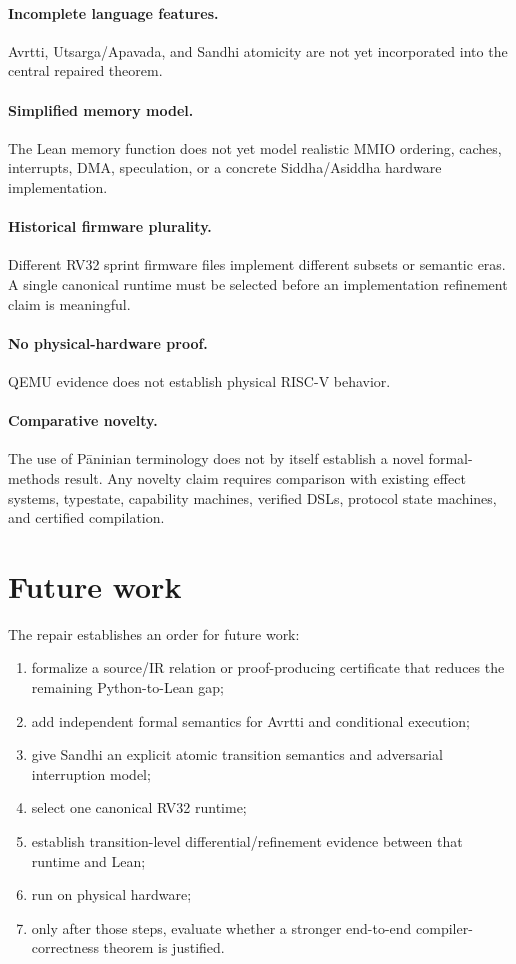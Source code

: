 \documentclass[11pt,a4paper]{article}
\begin{document}
\paragraph{Incomplete language features.}
Avrtti, Utsarga/Apavada, and Sandhi atomicity are not yet incorporated into
the central repaired theorem.

\paragraph{Simplified memory model.}
The Lean memory function does not yet model realistic MMIO ordering, caches,
interrupts, DMA, speculation, or a concrete Siddha/Asiddha hardware
implementation.

\paragraph{Historical firmware plurality.}
Different RV32 sprint firmware files implement different subsets or semantic
eras. A single canonical runtime must be selected before an implementation
refinement claim is meaningful.

\paragraph{No physical-hardware proof.}
QEMU evidence does not establish physical RISC-V behavior.

\paragraph{Comparative novelty.}
The use of P\={a}ninian terminology does not by itself establish a novel
formal-methods result. Any novelty claim requires comparison with existing
effect systems, typestate, capability machines, verified DSLs, protocol state
machines, and certified compilation.

\section{Future work}

The repair establishes an order for future work:

\begin{enumerate}
\item formalize a source/IR relation or proof-producing certificate that
      reduces the remaining Python-to-Lean gap;
\item add independent formal semantics for Avrtti and conditional execution;
\item give Sandhi an explicit atomic transition semantics and adversarial
      interruption model;
\item select one canonical RV32 runtime;
\item establish transition-level differential/refinement evidence between
      that runtime and Lean;
\item run on physical hardware;
\item only after those steps, evaluate whether a stronger end-to-end
      compiler-correctness theorem is justified.
\end{enumerate}
\end{document}
